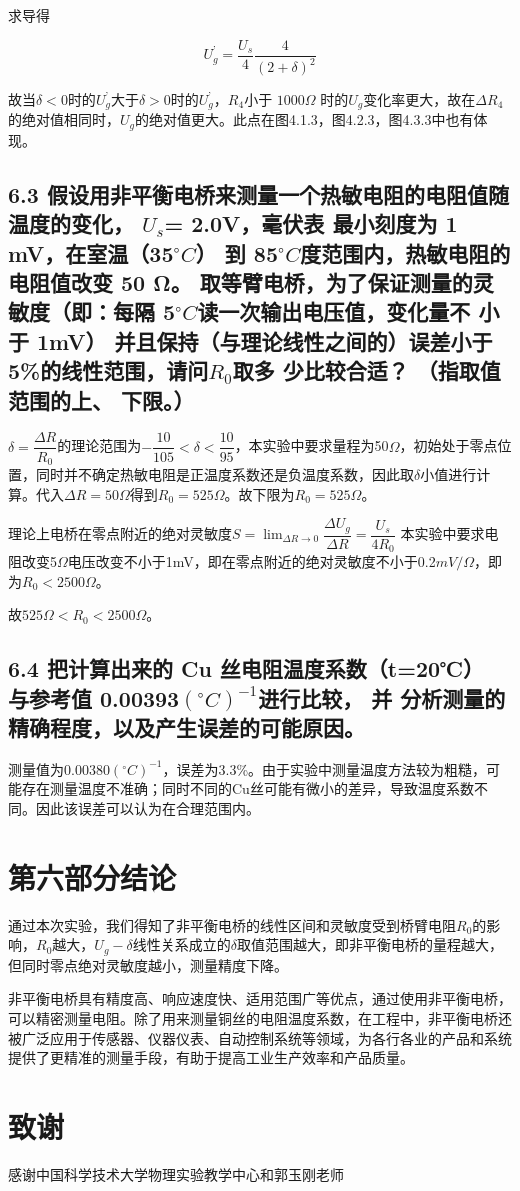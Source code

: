 \documentclass{ctexart}
\begin{document}
        求导得

        $$U_g^\text{'}=\dfrac{U_s}{4}\dfrac{4}{(2+\delta)^2}$$

        故当$\delta<0$时的$U_{g}^\text{'}$大于$\delta>0$时的$U_{g}^\text{'}$，$R_4$小于 $1000\Omega$ 时的$U_g$变化率更大，故在$\Delta R_4$的绝对值相同时，$U_g$的绝对值更大。此点在图4.1.3，图4.2.3，图4.3.3中也有体现。

        \subsection*{6.3 假设用非平衡电桥来测量一个热敏电阻的电阻值随温度的变化， $U_s$= 2.0V，毫伏表
        最小刻度为 1 mV，在室温（35$^\circ C$） 到 85$^\circ C$度范围内，热敏电阻的电阻值改变 50 Ω。
        取等臂电桥，为了保证测量的灵敏度（即：每隔 5$^\circ C$读一次输出电压值，变化量不
        小于 1mV） 并且保持（与理论线性之间的）误差小于 5\%的线性范围，请问$R_0$取多
        少比较合适？ （指取值范围的上、 下限。）}

        $\delta=\dfrac{\Delta R}{R_0}$的理论范围为$-\dfrac{10}{105}<\delta<\dfrac{10}{95}$，本实验中要求量程为50$\Omega$，初始处于零点位置，同时并不确定热敏电阻是正温度系数还是负温度系数，因此取$\delta$小值进行计算。代入$\Delta R=50\Omega$得到$R_0=525\Omega$。故下限为$R_0=525\Omega$。

        理论上电桥在零点附近的绝对灵敏度$S=\lim_{\Delta R \to 0}\dfrac{\Delta U_g}{\Delta R}=\dfrac{U_s}{4R_0}  $
        本实验中要求电阻改变5$\Omega$电压改变不小于1mV，即在零点附近的绝对灵敏度不小于0.2$mV/\Omega$，即为$R_0<2500\Omega$。

        故$525\Omega<R_0<2500\Omega$。

        \subsection*{6.4 把计算出来的 Cu 丝电阻温度系数（t=20℃） 与参考值 0.00393$(^\circ C)^{−1}$进行比较， 并
        分析测量的精确程度，以及产生误差的可能原因。}
        测量值为0.00380$(^\circ C)^{-1}$，误差为3.3\%。由于实验中测量温度方法较为粗糙，可能存在测量温度不准确；同时不同的Cu丝可能有微小的差异，导致温度系数不同。因此该误差可以认为在合理范围内。

        \section*{第六部分\quad 结论}
        通过本次实验，我们得知了非平衡电桥的线性区间和灵敏度受到桥臂电阻$R_0$的影响，$R_0$越大，$U_g - \delta$线性关系成立的$\delta$取值范围越大，即非平衡电桥的量程越大，但同时零点绝对灵敏度越小，测量精度下降。
        
        非平衡电桥具有精度高、响应速度快、适用范围广等优点，通过使用非平衡电桥，可以精密测量电阻。除了用来测量铜丝的电阻温度系数，在工程中，非平衡电桥还被广泛应用于传感器、仪器仪表、自动控制系统等领域，为各行各业的产品和系统提供了更精准的测量手段，有助于提高工业生产效率和产品质量。

    \section*{致谢}
\begin{center}
	感谢中国科学技术大学物理实验教学中心和郭玉刚老师
\end{center}
\label{unknown}
\end{document}
